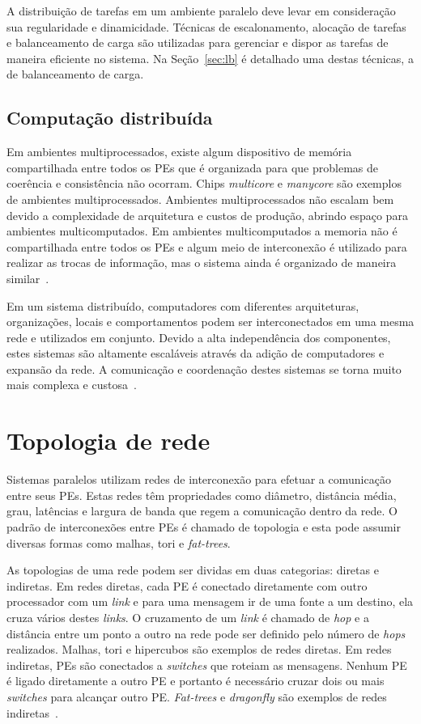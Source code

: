 \documentclass[
	12pt,				%
	openright,			%
	twoside,			%
	a4paper,			%
	english,			%
	brazil,				%
	]{abntex2}
\newcommand{\links}{\textit{links}\xspace}
\newcommand{\link}{\textit{link}\xspace}
\newcommand{\hops}{\textit{hops}\xspace}
\newcommand{\hop}{\textit{hop}\xspace}
\newcommand{\Fatts}{\textit{Fat-trees}\xspace}
\newcommand{\dgfly}{\textit{dragonfly}\xspace}
\newcommand{\switches}{\textit{switches}\xspace}
\begin{document}
A distribuição de tarefas em um ambiente paralelo deve levar em consideração sua regularidade e dinamicidade. 
Técnicas de escalonamento, alocação de tarefas e balanceamento de carga são utilizadas para gerenciar e dispor as tarefas de maneira eficiente no sistema. 
Na Seção~\ref{sec:lb} é detalhado uma destas técnicas, a de balanceamento de carga.

\subsection{Computação distribuída}

Em ambientes multiprocessados, existe algum dispositivo de memória compartilhada entre todos os PEs que é organizada para que problemas de coerência e consistência não ocorram. 
Chips \textit{multicore} e \textit{manycore} são exemplos de ambientes multiprocessados. 
Ambientes multiprocessados não escalam bem devido a complexidade de arquitetura e custos de produção, abrindo espaço para ambientes multicomputados. 
Em ambientes multicomputados a memoria não é compartilhada entre todos os PEs e algum meio de interconexão é utilizado para realizar as trocas de informação, mas o sistema ainda é organizado de maneira similar~\cite{tanenbaum:operational_systems}.

Em um sistema distribuído, computadores com diferentes arquiteturas, organizações, locais e comportamentos podem ser interconectados em uma mesma rede e utilizados em conjunto. 
Devido a alta independência dos componentes, estes sistemas são altamente escaláveis através da adição de computadores e expansão da rede. 
A comunicação e coordenação destes sistemas se torna muito mais complexa e custosa~\cite{tanenbaum:operational_systems}.


\section{Topologia de rede}
\label{sec:topologia}

Sistemas paralelos utilizam redes de interconexão para efetuar a comunicação entre seus PEs. 
Estas redes têm propriedades como diâmetro, distância média, grau, latências e largura de banda que regem a comunicação dentro da rede. 
O padrão de interconexões entre PEs é chamado de topologia e esta pode assumir diversas formas como malhas, tori e \textit{fat-trees}.

As topologias de uma rede podem ser dividas em duas categorias: diretas e indiretas. 
Em redes diretas, cada PE é conectado diretamente com outro processador com um \link e para uma mensagem ir de uma fonte a um destino, ela cruza vários destes \links.
O cruzamento de um \link é chamado de \hop e a distância entre um ponto a outro na rede pode ser definido pelo número de \hops realizados. 
Malhas, tori e hipercubos são exemplos de redes diretas. 
Em redes indiretas, PEs são conectados a \switches que roteiam as mensagens. Nenhum PE é ligado diretamente a outro PE e portanto é necessário cruzar dois ou mais \switches para alcançar outro PE. 
\Fatts e \dgfly são exemplos de redes indiretas~\cite{bhatele-encyclopedia}.
\end{document}
